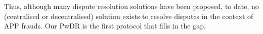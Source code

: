 


 

Thus, although many dispute resolution solutions have been proposed, to date, no  (centralised or decentralised) solution exists to resolve disputes in the context of APP frauds. Our PwDR is the first protocol that fills in the gap. 

 



